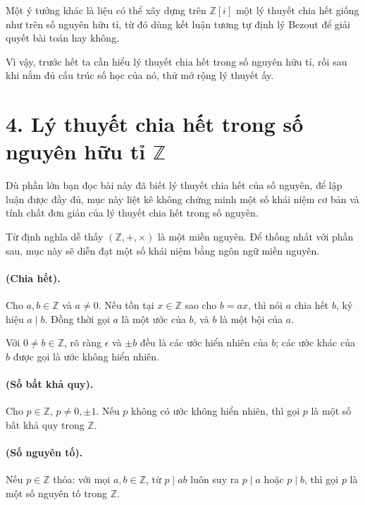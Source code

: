 \documentclass[11pt]{article}
\begin{document}
Một ý tưởng khác là liệu có thể xây dựng trên \(\mathbb Z[i]\) một lý thuyết
chia hết giống như trên số nguyên hữu tỉ, từ đó dùng kết luận tương tự định
lý Bezout để giải quyết bài toán hay không.

Vì vậy, trước hết ta cần hiểu lý thuyết chia hết trong số nguyên hữu tỉ, rồi
sau khi nắm đủ cấu trúc số học của nó, thử mở rộng lý thuyết ấy.

\section*{4. Lý thuyết chia hết trong số nguyên hữu tỉ \(\mathbb Z\)}

Dù phần lớn bạn đọc bài này đã biết lý thuyết chia hết của số nguyên, để lập
luận được đầy đủ, mục này liệt kê không chứng minh một số khái niệm cơ bản và
tính chất đơn giản của lý thuyết chia hết trong số nguyên.

Từ định nghĩa dễ thấy \((\mathbb Z,+,\times)\) là một miền nguyên. Để thống
nhất với phần sau, mục này sẽ diễn đạt một số khái niệm bằng ngôn ngữ miền
nguyên.

\paragraph{ (Chia hết).}
Cho \(a,b\in\mathbb Z\) và \(a\ne0\). Nếu tồn tại \(x\in\mathbb Z\) sao cho
\(b=ax\), thì nói \(a\) chia hết \(b\), ký hiệu \(a\mid b\). Đồng thời gọi
\(a\) là một ước của \(b\), và \(b\) là một bội của \(a\).

Với \(0\ne b\in\mathbb Z\), rõ ràng \(\epsilon\) và \(\pm b\) đều là các ước
hiển nhiên của \(b\); các ước khác của \(b\) được gọi là ước không hiển nhiên.

\paragraph{ (Số bất khả quy).}
Cho \(p\in\mathbb Z\), \(p\ne0,\pm1\). Nếu \(p\) không có ước không hiển
nhiên, thì gọi \(p\) là một số bất khả quy trong \(\mathbb Z\).

\paragraph{ (Số nguyên tố).}
Nếu \(p\in\mathbb Z\) thỏa: với mọi \(a,b\in\mathbb Z\), từ \(p\mid ab\) luôn
suy ra \(p\mid a\) hoặc \(p\mid b\), thì gọi \(p\) là một số nguyên tố trong
\(\mathbb Z\).
\end{document}
